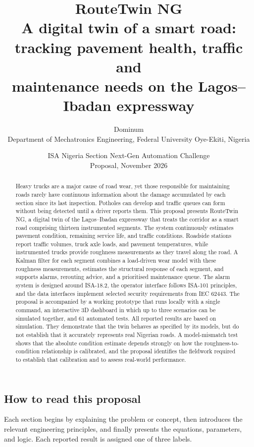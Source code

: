 \documentclass[11pt,a4paper]{article}
\title{\textbf{RouteTwin NG}\\[3pt]\large A digital twin of a smart road: tracking pavement health, traffic and\\maintenance needs on the Lagos--Ibadan expressway}
\author{Dominum\\ Department of Mechatronics Engineering, Federal University Oye-Ekiti, Nigeria}
\date{ISA Nigeria Section Next-Gen Automation Challenge\\Proposal, November 2026}
\begin{document}
\maketitle

\begin{abstract}
Heavy trucks are a major cause of road wear, yet those responsible for maintaining roads rarely have continuous information about the damage accumulated by each section since its last inspection. Potholes can develop and traffic queues can form without being detected until a driver reports them. This proposal presents RouteTwin NG, a digital twin of the Lagos--Ibadan expressway that treats the corridor as a smart road comprising thirteen instrumented segments. The system continuously estimates pavement condition, remaining service life, and traffic conditions. Roadside stations report traffic volumes, truck axle loads, and pavement temperatures, while instrumented trucks provide roughness measurements as they travel along the road. A Kalman filter for each segment combines a load-driven wear model with these roughness measurements, estimates the structural response of each segment, and supports alarms, rerouting advice, and a prioritised maintenance queue. The alarm system is designed around ISA-18.2, the operator interface follows ISA-101 principles, and the data interfaces implement selected security requirements from IEC 62443. The proposal is accompanied by a working prototype that runs locally with a single command, an interactive 3D dashboard in which up to three scenarios can be simulated together, and 61 automated tests. All reported results are based on simulation. They demonstrate that the twin behaves as specified by its models, but do not establish that it accurately represents real Nigerian roads. A model-mismatch test shows that the absolute condition estimate depends strongly on how the roughness-to-condition relationship is calibrated, and the proposal identifies the fieldwork required to establish that calibration and to assess real-world performance.
\end{abstract}

\subsection*{How to read this proposal}
Each section begins by explaining the problem or concept, then introduces the relevant engineering principles, and finally presents the equations, parameters, and logic. Each reported result is assigned one of three labels.
\end{document}
